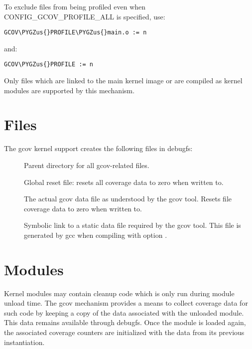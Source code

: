 \documentclass[a4paper,8pt,english]{sphinxmanual}
\def\PYGZus{\char`\_}
\begin{document}
To exclude files from being profiled even when CONFIG\_GCOV\_PROFILE\_ALL
is specified, use:

\begin{Verbatim}[commandchars=\\\{\}]
GCOV\PYGZus{}PROFILE\PYGZus{}main.o := n
\end{Verbatim}

and:

\begin{Verbatim}[commandchars=\\\{\}]
GCOV\PYGZus{}PROFILE := n
\end{Verbatim}

Only files which are linked to the main kernel image or are compiled as
kernel modules are supported by this mechanism.


\section{Files}
\label{dev-tools/gcov:files}
The gcov kernel support creates the following files in debugfs:
\begin{description}
\item[{}] \leavevmode
Parent directory for all gcov-related files.

\item[{}] \leavevmode
Global reset file: resets all coverage data to zero when
written to.

\item[{}] \leavevmode
The actual gcov data file as understood by the gcov
tool. Resets file coverage data to zero when written to.

\item[{}] \leavevmode
Symbolic link to a static data file required by the gcov
tool. This file is generated by gcc when compiling with
option .

\end{description}


\section{Modules}
\label{dev-tools/gcov:modules}
Kernel modules may contain cleanup code which is only run during
module unload time. The gcov mechanism provides a means to collect
coverage data for such code by keeping a copy of the data associated
with the unloaded module. This data remains available through debugfs.
Once the module is loaded again, the associated coverage counters are
initialized with the data from its previous instantiation.
\end{document}
